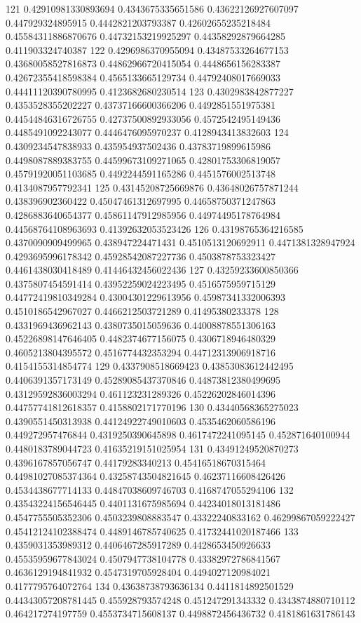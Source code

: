 121 0.42910981330893694 0.4343675335651586 0.43622126927607097 0.447929324895915 0.4442821203793387 0.42602655235218484 0.45584311886870676 0.44732153219925297 0.44358292879664285 0.411903324740387
122 0.4296986370955094 0.43487533264677153 0.43680058527816873 0.44862966720415054 0.4448656156283387 0.42672355418598384 0.4565133665129734 0.44792408017669033 0.44411120390780995 0.4123682680230514
123 0.4302983842877227 0.4353528355202227 0.43737166600366206 0.4492851551975381 0.44544846316726755 0.42737500892933056 0.4572542495149436 0.4485491092243077 0.4446476095970237 0.4128943413832603
124 0.4309234547838933 0.435954937502436 0.43783719899615986 0.4498087889383755 0.44599673109271065 0.42801753306819057 0.45791920051103685 0.4492244591165286 0.4451576002513748 0.4134087957792341
125 0.43145208725669876 0.43648026757871244 0.438396902360422 0.45047461312697995 0.44658750371247863 0.4286883640654377 0.45861147912985956 0.44974495178764984 0.44568764108963693 0.41392632053523426
126 0.43198765364216585 0.4370090909499965 0.438947224471431 0.4510513120692911 0.4471381328947924 0.4293695996178342 0.45928542087227736 0.4503878753323427 0.4461438030418489 0.41446432456022436
127 0.43259233600850366 0.4375807454591414 0.43952259024223495 0.4516575959715129 0.44772419810349284 0.43004301229613956 0.45987341332006393 0.4510186542967027 0.4466212503721289 0.41495380233378
128 0.4331969436962143 0.4380735015059636 0.44008878551306163 0.45226898147646405 0.4482374677156075 0.4306718946480329 0.4605213804395572 0.4516774432353294 0.44712313906918716 0.4154155314854774
129 0.4337908518669423 0.43853083612442495 0.4406391357173149 0.45289085437370846 0.44873812380499695 0.43129592836003294 0.461123231289326 0.45226202846014396 0.44757741812618357 0.4158802171770196
130 0.43440568365275023 0.4390551450313938 0.44124922749010603 0.4535462060586196 0.449272957476844 0.4319250390645898 0.4617472241095145 0.452871640100944 0.4480183789044723 0.41635219151025954
131 0.43491249520870273 0.4396167857056747 0.44179283340213 0.45416518670315464 0.44981027085374364 0.43258743504821645 0.46237116608426426 0.4534438677714133 0.44847038609746703 0.4168747055294106
132 0.43543224156546445 0.4401131675985694 0.44234018013181486 0.4547755505352306 0.4503239808883547 0.43322240833162 0.46299867059222427 0.45412124102388474 0.4489146785740625 0.41732441020187466
133 0.4359031353989312 0.4406467285917289 0.4428653450926633 0.45535959677843024 0.4507947738104778 0.43382972786841567 0.4636129194841932 0.4547319705928404 0.4494027120984021 0.4177795764072764
134 0.43638738793636134 0.4411814892501529 0.44343057208781445 0.455928793574248 0.451247291343332 0.4343874880710112 0.464217274197759 0.4553734715608137 0.4498872456436732 0.4181861631786143
